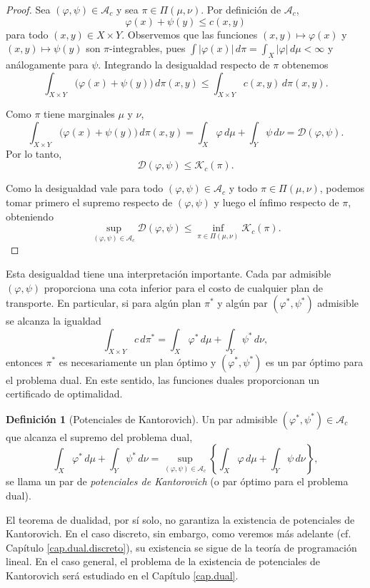 \documentclass[12pt, a4paper]{amsbook}
\newcommand{\D}{{\mathcal D}}
\theoremstyle{remark}
\theoremstyle{definition}
\newtheorem{defi}[teo]{Definición}
\numberwithin{section}{chapter}
\numberwithin{subsection}{section}
\numberwithin{equation}{section}
\numberwithin{figure}{chapter}
\begin{document}
\begin{proof}
Sea $(\varphi,\psi)\in\mathcal A_c$ y sea
\(
\pi\in\Pi(\mu,\nu).
\)
Por definición de $\mathcal A_c$,
\[
\varphi(x)+\psi(y)\leq c(x,y)
\]
para todo $(x,y)\in X\times Y$. Observemos que las funciones
$(x,y)\mapsto\varphi(x)$ y $(x,y)\mapsto\psi(y)$ son $\pi$-integrables, pues
$\int|\varphi(x)|\,d\pi=\int_X|\varphi|\,d\mu<\infty$ y análogamente para
$\psi$. Integrando la desigualdad respecto de $\pi$ obtenemos
\[
\int_{X\times Y}
\bigl(\varphi(x)+\psi(y)\bigr)\,d\pi(x,y)
\leq
\int_{X\times Y}c(x,y)\,d\pi(x,y).
\]

Como $\pi$ tiene marginales $\mu$ y $\nu$,
\[
\int_{X\times Y}
\bigl(\varphi(x)+\psi(y)\bigr)\,d\pi(x,y)
=
\int_X\varphi\,d\mu
+
\int_Y\psi\,d\nu
=
\D(\varphi,\psi).
\]
Por lo tanto,
\[
\D(\varphi,\psi)\leq\mathcal K_c(\pi).
\]

Como la desigualdad vale para todo
$(\varphi,\psi)\in\mathcal A_c$ y todo
$\pi\in\Pi(\mu,\nu)$, podemos tomar primero el supremo respecto de
$(\varphi,\psi)$ y luego el ínfimo respecto de $\pi$, obteniendo
\[
\sup_{(\varphi,\psi)\in\mathcal A_c}
\D(\varphi,\psi)
\leq
\inf_{\pi\in\Pi(\mu,\nu)}
\mathcal K_c(\pi).
\]
\end{proof}

Esta desigualdad tiene una interpretación importante. Cada par admisible
$(\varphi,\psi)$ proporciona una cota inferior para el costo de cualquier
plan de transporte. En particular, si para algún plan $\pi^*$ y algún par
$(\varphi^*,\psi^*)$ admisible se alcanza la igualdad
\[
\int_{X\times Y} c\,d\pi^*
=
\int_X\varphi^*\,d\mu
+
\int_Y\psi^*\,d\nu,
\]
entonces $\pi^*$ es necesariamente un plan óptimo y $(\varphi^*,\psi^*)$ es un
par óptimo para el problema dual. En este sentido, las funciones duales
proporcionan un certificado de optimalidad.

\begin{defi}[Potenciales de Kantorovich]\label{def.potenciales}
Un par admisible $(\varphi^*,\psi^*)\in\mathcal A_c$ que alcanza el supremo
del problema dual,
\[
\int_X\varphi^*\,d\mu
+
\int_Y\psi^*\,d\nu
=
\sup_{(\varphi,\psi)\in\mathcal A_c}
\left\{
\int_X\varphi\,d\mu
+
\int_Y\psi\,d\nu
\right\},
\]
se llama un par de \emph{potenciales de Kantorovich} (o par óptimo para el
problema dual).
\end{defi}

El teorema de dualidad, por sí solo, no garantiza la existencia de
potenciales de Kantorovich. En el caso discreto,
sin embargo, como veremos más adelante (cf. Capítulo \ref{cap.dual.discreto}), su existencia se sigue de la
teoría de programación lineal. En el caso general, el problema de la
existencia de potenciales de Kantorovich será estudiado en el Capítulo \ref{cap.dual}.
\end{document}
